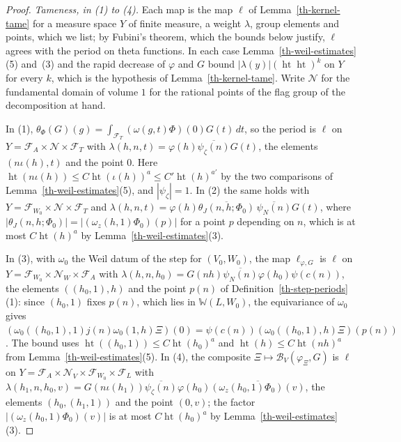 \begin{proof}
\emph{Tameness, in (1) to (4).} Each map is the map $\ell$ of
Lemma~\ref{th-kernel-tame} for a measure space $Y$ of finite measure, a weight
$\lambda$, group elements and points, which we list; by Fubini's theorem, which the
bounds below justify, $\ell$ agrees with the period on theta functions. In each
case Lemma~\ref{th-weil-estimates}(5) and~(3) and the rapid decrease of
$\varphi$ and $G$ bound $|\lambda(y)|(\operatorname{ht}\operatorname{ht})^k$ on $Y$
for every $k$, which is the hypothesis of Lemma~\ref{th-kernel-tame}. Write
$\mathcal N$ for the fundamental domain of volume $1$ for the rational points
of the flag group of the decomposition at hand.

In (1), $\theta_\Phi(G)(g)=\int_{\mathcal F_T}(\omega(g,t)\Phi)(0)G(t)\,dt$, so
the period is $\ell$ on $Y=\mathcal F_A\times\mathcal N\times\mathcal F_T$ with
$\lambda(h,n,t)=\varphi(h)\overline{\psi_\zeta(n)}G(t)$, the elements
$(n\iota(h),t)$ and the point $0$. Here
$\operatorname{ht}(n\iota(h))\leq C\operatorname{ht}(\iota(h))^a\leq
C'\operatorname{ht}(h)^{a'}$ by the two comparisons of
Lemma~\ref{th-weil-estimates}(5), and $|\psi_\zeta|=1$. In (2) the same holds
with $Y=\mathcal F_{W_0}\times\mathcal N\times\mathcal F_T$ and
$\lambda(h,n,t)=\varphi(h)\overline{\theta_J(n,h;\Phi_0)}\,\overline{\psi_N(n)}G(t)$,
where $|\theta_J(n,h;\Phi_0)|=|(\omega_z(h,1)\Phi_0)(p)|$ for a point $p$
depending on $n$, which is at most $C\operatorname{ht}(h)^a$ by
Lemma~\ref{th-weil-estimates}(3).

In (3), with $\omega_0$ the Weil datum of the step for $(V_0,W_0)$, the map
$\ell_{\varphi,G}$ is $\ell$ on
$Y=\mathcal F_{W_0}\times\mathcal N_W\times\mathcal F_A$ with
$\lambda(h,n,h_0)=G(nh)\overline{\psi_N(n)}\varphi(h_0)\psi(c(n))$, the elements
$((h_0,1),h)$ and the point $p(n)$ of Definition~\ref{th-step-periods}(1):
since $(h_0,1)$ fixes $p(n)$, which lies in $\mathbb W(L,W_0)$, the
equivariance of $\omega_0$ gives
$(\omega_0((h_0,1),1)j(n)\omega_0(1,h)\Xi)(0)=\psi(c(n))(\omega_0((h_0,1),h)\Xi)(p(n))$.
The bound uses $\operatorname{ht}((h_0,1))\leq C\operatorname{ht}(h_0)^a$ and
$\operatorname{ht}(h)\leq C\operatorname{ht}(nh)^a$ from
Lemma~\ref{th-weil-estimates}(5). In (4), the composite
$\Xi\mapsto\mathcal B_V(\varphi_\Xi,G)$ is $\ell$ on
$Y=\mathcal F_A\times\mathcal N_V\times\mathcal F_{W_0}\times\mathcal F_L$ with
$\lambda(h_1,n,h_0,v)=G(n\iota(h_1))\overline{\psi_\zeta(n)}\varphi(h_0)\overline{(\omega_z(h_0,1)\Phi_0)(v)}$,
the elements $(h_0,(h_1,1))$ and the point $(0,v)$; the factor
$|(\omega_z(h_0,1)\Phi_0)(v)|$ is at most $C\operatorname{ht}(h_0)^a$ by
Lemma~\ref{th-weil-estimates}(3).


\end{proof}
